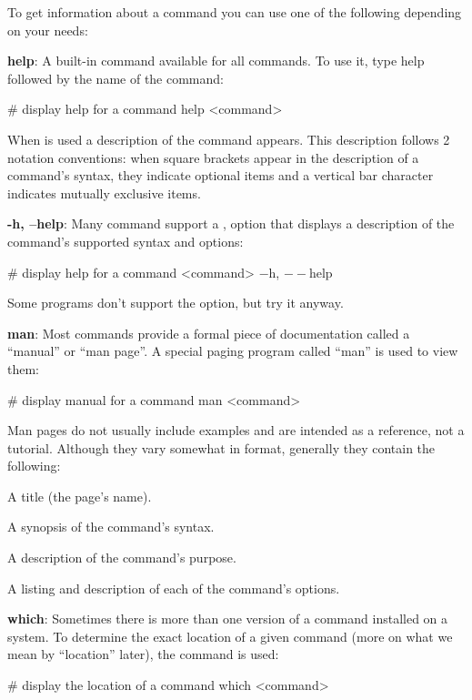 To get information about a command you can use one of the following depending on your needs:
\bit
\item \textbf{help}: A built-in command available for all commands. To use it, type help followed by the name
of the command:
\begin{bash}
# display help for a command
help <command>
\end{bash}

When  is used a description of the command appears. This description follows 2 notation conventions: when
square brackets appear in the description of a command's syntax, they indicate optional items and a vertical bar
character indicates mutually exclusive items.

\item \textbf{-h, --help}: Many command support a ,  option that displays a description of the
command's supported syntax and options:
\begin{bash}
# display help for a command
<command> $-$h, $--$help
\end{bash}

Some programs don't support the option, but try it anyway.

\item \textbf{man}: Most commands provide a formal piece of documentation called a ``manual'' or ``man page''. A special
paging program called ``man'' is used to view them:
\begin{bash}
# display manual for a command
man <command>
\end{bash}

Man pages do not usually include examples and are intended as a reference, not a tutorial. Although they vary somewhat
in format, generally they contain the following:
\bit
\item A title (the page's name).
\item A synopsis of the command's syntax.
\item A description of the command's purpose.
\item A listing and description of each of the command's options.
\eit

\item \textbf{which}: Sometimes there is more than one version of a command installed on a system. To determine the
exact location of a given command (more on what we mean by ``location'' later), the  command is used:
\begin{bash}
# display the location of a command
which <command>
\end{bash}
\eit

